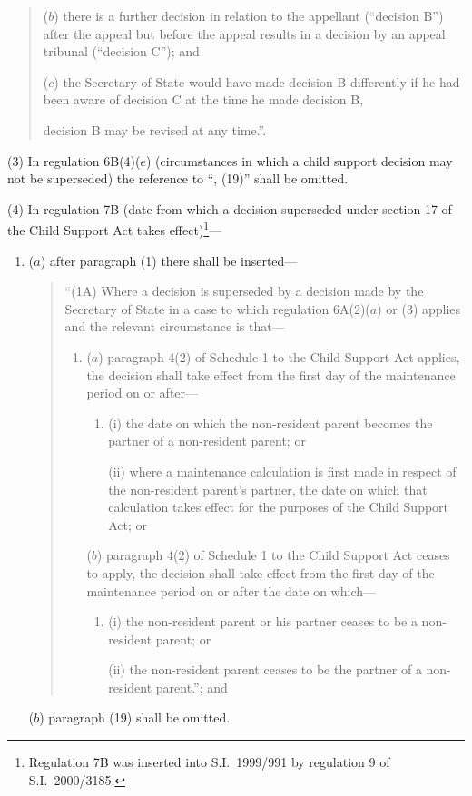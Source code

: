 \documentclass[12pt,a4paper]{article}
\begin{document}
\begin{enumerate}
\begin{quotation}
\begin{enumerate}
($b$) there is a further decision in relation to the appellant (“decision B”) after the appeal but before the appeal results in a decision by an appeal tribunal (“decision C”); and

($c$) the Secretary of State would have made decision B differently if he had been aware of decision C at the time he made decision B,
\end{enumerate}
decision B may be revised at any time.”.
\end{quotation}
\end{enumerate}

(3) In regulation 6B(4)($e$)  (circumstances in which a child support decision may not be superseded) the reference to “, (19)” shall be omitted.

(4) In regulation 7B (date from which a decision superseded under section 17 of the Child Support Act takes effect)\footnote{Regulation 7B was inserted into S.I.\ 1999/991 by regulation 9 of S.I.\ 2000/3185.}—
\begin{enumerate}\item[]
($a$) after paragraph (1) there shall be inserted—
\begin{quotation}
“(1A) Where a decision is superseded by a decision made by the Secretary of State in a case to which regulation 6A(2)($a$)  or (3) applies and the relevant circumstance is that—
\begin{enumerate}\item[]
($a$) paragraph 4(2) of Schedule 1 to the Child Support Act applies, the decision shall take effect from the first day of the maintenance period on or after—
\begin{enumerate}\item[]
(i) the date on which the non-resident parent becomes the partner of a non-resident parent; or

(ii) where a maintenance calculation is first made in respect of the non-resident parent’s partner, the date on which that calculation takes effect for the purposes of the Child Support Act; or
\end{enumerate}

($b$) paragraph 4(2) of Schedule 1 to the Child Support Act ceases to apply, the decision shall take effect from the first day of the maintenance period on or after the date on which—
\begin{enumerate}\item[]
(i) the non-resident parent or his partner ceases to be a non-resident parent; or

(ii) the non-resident parent ceases to be the partner of a non-resident parent.”; and
\end{enumerate}
\end{enumerate}
\end{quotation}

($b$) paragraph (19) shall be omitted.
\end{enumerate}
\end{document}
